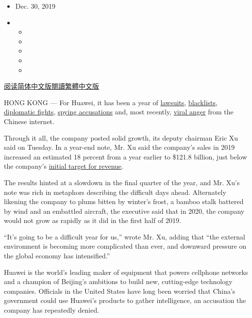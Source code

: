 \begin{itemize}
\item
  Dec. 30, 2019
\item
  \begin{itemize}
  \item
  \item
  \item
  \item
  \item
  \end{itemize}
\end{itemize}

\href{https://cn.nytimes.com/business/20191231/huawei-revenue-growth/}{阅读简体中文版}\href{https://cn.nytimes.com/business/20191231/huawei-revenue-growth/zh-hant/}{閱讀繁體中文版}

HONG KONG --- For Huawei, it has been a year of
\href{https://www.nytimes.com/2019/03/04/technology/huawei-lawsuit-us-government.html}{lawsuits},
\href{https://www.nytimes.com/2019/05/16/technology/huawei-ban-president-trump.html}{blacklists},
\href{https://www.nytimes.com/2019/12/27/world/europe/huawei-EU-5G-Europe.html}{diplomatic
fights},
\href{https://www.nytimes.com/2019/01/11/world/europe/poland-china-huawei-spy.html}{spying
accusations} and, most recently,
\href{https://www.nytimes.com/2019/12/04/technology/huawei-china-backlash.html}{viral
anger} from the Chinese internet.

Through it all, the company posted solid growth, its deputy chairman
Eric Xu said on Tuesday. In a year-end note, Mr. Xu said the company's
sales in 2019 increased an estimated 18 percent from a year earlier to
\$121.8 billion, just below the company's
\href{https://www.nytimes.com/2019/06/17/technology/huawei-trump.html}{initial
target for revenue}.

The results hinted at a slowdown in the final quarter of the year, and
Mr. Xu's note was rich in metaphors describing the difficult days ahead.
Alternately likening the company to plums bitten by winter's frost, a
bamboo stalk battered by wind and an embattled aircraft, the executive
said that in 2020, the company would not grow as rapidly as it did in
the first half of 2019.

``It's going to be a difficult year for us,'' wrote Mr. Xu, adding that
``the external environment is becoming more complicated than ever, and
downward pressure on the global economy has intensified.''

Huawei is the world's leading maker of equipment that powers cellphone
networks and a champion of Beijing's ambitions to build new,
cutting-edge technology companies. Officials in the United States have
long been worried that China's government could use Huawei's products to
gather intelligence, an accusation the company has repeatedly denied.

